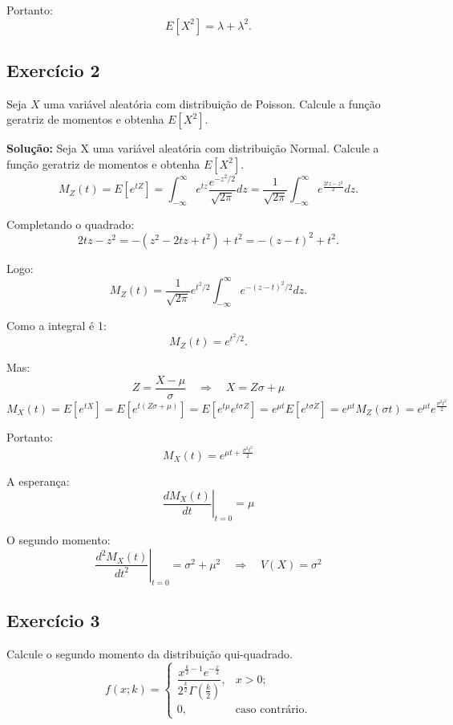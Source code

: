 \documentclass{article}
\begin{document}
Portanto:
    $$
    E[X^2] = \lambda + \lambda^2.
    $$

\subsection{Exercício 2}
Seja $X$ uma variável aleatória com distribuição de Poisson. Calcule a função geratriz de momentos e obtenha $E[X^2]$.

\vspace{0.5cm}
\textbf{Solução:} 
Seja X uma variável aleatória com distribuição Normal. Calcule a função geratriz de momentos e obtenha $E[X^2]$.
    $$
    M_Z(t) = E[e^{tZ}] 
    = \int_{-\infty}^{\infty} e^{tz} \frac{e^{-z^2/2}}{\sqrt{2\pi}} dz
    = \frac{1}{\sqrt{2\pi}} \int_{-\infty}^{\infty} 
    e^{\frac{2tz - z^2}{2}} dz.
    $$

Completando o quadrado:
    $$
    2tz - z^2 = -\left(z^2 - 2tz + t^2\right) + t^2
    = -\left(z - t\right)^2 + t^2.
    $$

Logo:
    $$
    M_Z(t) = \frac{1}{\sqrt{2\pi}} e^{t^2/2} 
    \int_{-\infty}^{\infty} e^{-(z-t)^2/2} dz.
    $$

Como a integral é 1:
    $$
    M_Z(t) = e^{t^2/2}.
    $$

Mas:
    $$
    Z = \frac{X - \mu}{\sigma} \quad \Rightarrow \quad X = Z\sigma + \mu
    $$
    $$
    M_X(t) = E[e^{tX}] 
    = E\left[e^{t(Z\sigma + \mu)}\right] 
    = E\left[e^{t\mu} e^{t\sigma Z}\right]
    = e^{\mu t} E\left[e^{t\sigma Z}\right]
    = e^{\mu t} M_Z(\sigma t)
    = e^{\mu t} e^{\frac{\sigma^2 t^2}{2}}
    $$

Portanto:
    $$
    M_X(t) = e^{\mu t + \frac{\sigma^2 t^2}{2}}
    $$

A esperança:
    $$
    \left.\frac{d M_X(t)}{dt}\right|_{t=0} = \mu
    $$

O segundo momento:
    $$
    \left.\frac{d^2 M_X(t)}{dt^2}\right|_{t=0} 
    = \sigma^2 + \mu^2 
    \quad\Rightarrow\quad
    V(X) = \sigma^2
    $$

\subsection{Exercício 3}
Calcule o segundo momento da distribuição qui-quadrado.
    $$
    f(x; k) = 
    \begin{cases}
    \dfrac{x^{\frac{k}{2}-1} e^{-\frac{x}{2}}}{2^{\frac{k}{2}} \Gamma\left(\frac{k}{2}\right)}, & x > 0; \\
    0, & \text{caso contrário}.
    \end{cases}
    $$
\end{document}
